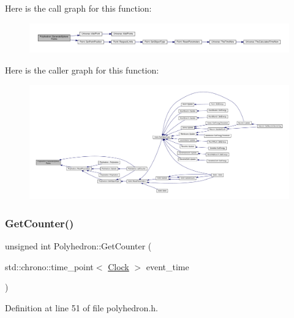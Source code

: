 Here is the call graph for this function\+:
\nopagebreak
\begin{figure}[H]
\begin{center}
\leavevmode
\includegraphics[width=350pt]{class_polyhedron_a15d1cae35ceb6c1ba559928fd417800c_cgraph}
\end{center}
\end{figure}
Here is the caller graph for this function\+:
\nopagebreak
\begin{figure}[H]
\begin{center}
\leavevmode
\includegraphics[width=350pt]{class_polyhedron_a15d1cae35ceb6c1ba559928fd417800c_icgraph}
\end{center}
\end{figure}
\mbox{\label{class_polyhedron_a021ec67f2040f8ec26df64e4b9370521}} 
\subsubsection{\texorpdfstring{Get\+Counter()}{GetCounter()}}
{\footnotesize\ttfamily unsigned int Polyhedron\+::\+Get\+Counter (\begin{DoxyParamCaption}\item[{std\+::chrono\+::time\+\_\+point$<$ \hyperlink{universe_8h_a0ef8d951d1ca5ab3cfaf7ab4c7a6fd80}{Clock} $>$}]{event\+\_\+time }\end{DoxyParamCaption})\hspace{0.3cm}{\ttfamily [inline]}}



Definition at line 51 of file polyhedron.\+h.

\mbox{\label{class_polyhedron_a4d61f89c56e15d96008856cfb540d558}} 
